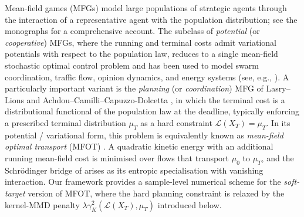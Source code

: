 \documentclass[11pt,leqno]{article}
\theoremstyle{plain}
\theoremstyle{remark}
\theoremstyle{definition}
\numberwithin{equation}{section}
\numberwithin{figure}{section}
\numberwithin{table}{section}
\numberwithin{algorithm}{section}
\begin{document}
Mean-field games (MFGs)
\cite{las-lio:2007,hua-cai-mal:2006}
model large populations of strategic agents through the interaction
of a representative agent with the population distribution;
see the monographs \cite{car-del:2018a,car-del:2018b} for a comprehensive account.
The subclass of \emph{potential} (or \emph{cooperative}) MFGs,
where the running and terminal costs admit variational potentials with respect to the population law,
reduces to a single mean-field stochastic optimal control problem
and has been used to model swarm coordination, traffic flow, opinion dynamics,
and energy systems (see, e.g., \cite{cou-per-tem-deb:2012,ma-cal-his:2013,par-gen-lyg:2020}).
A particularly important variant is the \emph{planning} (or \emph{coordination}) MFG of Lasry--Lions
and Achdou--Camilli--Capuzzo-Dolcetta \cite{ach-cam-cap:2012},
in which the terminal cost is a distributional functional of the population law at the deadline,
typically enforcing a prescribed terminal distribution $\mu_T$ as a hard constraint $\mathcal{L}(X_T)=\mu_T$.
In its potential / variational form, this problem is equivalently known as
\emph{mean-field optimal transport} (MFOT) \cite{ben-car-hat:2019,car-mes-san:2017}.
A quadratic kinetic energy with an additional running mean-field cost is minimised
over flows that transport $\mu_0$ to $\mu_T$, and the Schr{\"o}dinger bridge of \cite{nak:2024sb} arises
as its entropic specialisation with vanishing interaction.
Our framework provides a sample-level numerical scheme for the \emph{soft-target} version of MFOT,
where the hard planning constraint is relaxed by the kernel-MMD penalty $\lambda\gamma_K^2(\mathcal{L}(X_T),\mu_T)$
introduced below.
\end{document}
